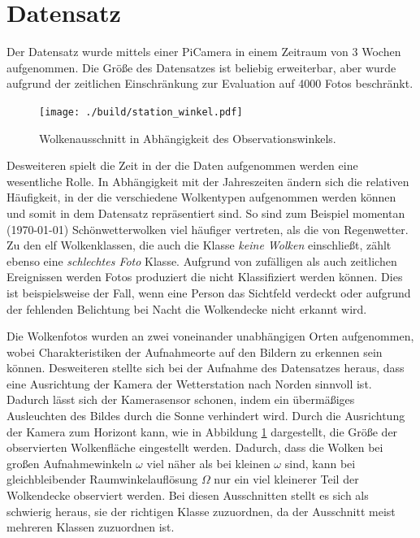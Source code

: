 \section{Datensatz}
\label{sec:02_Datensatz}

Der Datensatz wurde mittels einer PiCamera in einem Zeitraum von 3 Wochen
aufgenommen. 
Die Größe des Datensatzes ist beliebig erweiterbar, aber wurde aufgrund der
zeitlichen Einschränkung zur Evaluation auf \num{4000} Fotos beschränkt. 

\begin{figure}
		\centering
		\vspace{-0.5cm}
		\texttt{[image: ./build/station\_winkel.pdf]}
		\caption{Wolkenausschnitt in Abhängigkeit des Observationswinkels.}
		\label{fig:theta}
		\vspace{-0.6cm}
\end{figure}
Desweiteren spielt die Zeit in der die Daten aufgenommen werden eine 
wesentliche Rolle.
In Abhängigkeit mit der Jahreszeiten ändern sich die relativen Häufigkeit, in 
der die verschiedene Wolkentypen aufgenommen werden können und somit in dem 
Datensatz repräsentiert sind. 
So sind zum Beispiel momentan (\today) Schönwetterwolken viel häufiger
vertreten, als die von Regenwetter. 
Zu den elf Wolkenklassen, die auch die Klasse \textit{keine Wolken} einschließt, 
zählt ebenso eine \textit{schlechtes Foto} Klasse. 
Aufgrund von zufälligen als auch zeitlichen Ereignissen werden Fotos produziert
die nicht Klassifiziert werden können.
Dies ist beispielsweise der Fall, wenn eine Person das Sichtfeld verdeckt oder 
aufgrund der fehlenden Belichtung bei Nacht die Wolkendecke nicht erkannt wird.

Die Wolkenfotos wurden an zwei voneinander unabhängigen Orten aufgenommen, wobei
Charakteristiken der Aufnahmeorte auf den Bildern zu erkennen sein können.
Desweiteren stellte sich bei der Aufnahme des Datensatzes heraus, dass eine
Ausrichtung der Kamera der Wetterstation nach Norden sinnvoll ist.
Dadurch lässt sich der Kamerasensor schonen, indem ein übermäßiges Ausleuchten
 des Bildes durch die Sonne verhindert wird.
Durch die Ausrichtung der Kamera zum Horizont kann, wie in Abbildung
 \ref{fig:theta} dargestellt, die Größe der observierten Wolkenfläche 
eingestellt werden.
Dadurch, dass die Wolken bei großen Aufnahmewinkeln $\omega$ viel näher als bei
kleinen $\omega$ sind, kann bei gleichbleibender Raumwinkelauflösung $\Omega$
nur ein viel kleinerer Teil der Wolkendecke observiert werden.
Bei diesen Ausschnitten stellt es sich als schwierig heraus, sie der richtigen
Klasse zuzuordnen, da der Ausschnitt meist mehreren Klassen zuzuordnen ist. 

